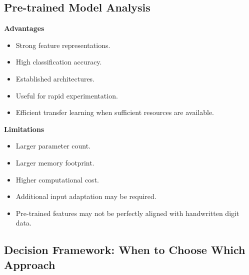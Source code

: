 \documentclass[12pt,a4paper]{report}
\begin{document}
\subsection{Pre-trained Model Analysis}

\textbf{Advantages}

\begin{itemize}
    \item Strong feature representations.
    \item High classification accuracy.
    \item Established architectures.
    \item Useful for rapid experimentation.
    \item Efficient transfer learning when sufficient resources
    are available.
\end{itemize}

\textbf{Limitations}

\begin{itemize}
    \item Larger parameter count.
    \item Larger memory footprint.
    \item Higher computational cost.
    \item Additional input adaptation may be required.
    \item Pre-trained features may not be perfectly aligned with
    handwritten digit data.
\end{itemize}

\subsection{Decision Framework: When to Choose Which Approach}
\end{document}
